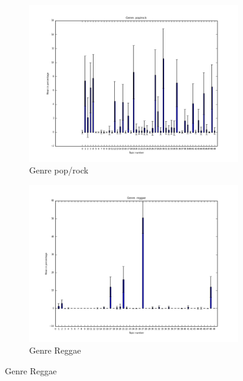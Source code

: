 \begin{figure}
\begin{subfigure}[b]{0.3\textwidth}
                \label{fig:topicdist_religious}
        \end{subfigure}
        ~ %
        \begin{subfigure}[b]{0.3\textwidth}
                \includegraphics[width=\textwidth]{bar_charts/pop-rock.png}
                \caption{Genre pop/rock}
                \label{fig:topicdist_poprock}
        \end{subfigure}
        \begin{subfigure}[b]{0.3\textwidth}
                \includegraphics[width=\textwidth]{bar_charts/reggae.png}
                \caption{Genre Reggae}

\end{subfigure}
\end{figure}
